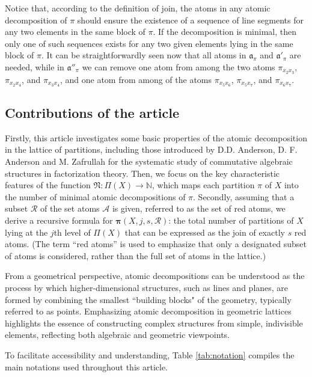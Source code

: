 \documentclass[12pt]{extarticle}
\begin{document}
	Notice that, according to the definition of join, the atoms in any atomic decomposition of $\pi$ should ensure the existence of a sequence of line segments for any two elements in the same block of $\pi$. If the decomposition is minimal, then only one of such sequences exists for any two given elements lying in the same block of $\pi$.
	It can be straightforwardly seen now that all atoms in $\mathfrak{a}_{\pi}$ and $\mathfrak{a}'_{\pi}$ are needed, while in $\mathfrak{a}''_{\pi}$ we can remove one atom from among the two atoms $\pi_{x_2x_3}$,  $\pi_{x_2x_4}$, and $\pi_{x_3x_4}$, and one atom from among of the atoms $\pi_{x_5x_6}$, $\pi_{x_5x_7}$, and $\pi_{x_6x_7}$.
	
\subsection*{Contributions of the article}
	Firstly, this article investigates some basic properties of the atomic decomposition in the lattice of partitions, including those introduced by D.D. Anderson, D. F. Anderson and M. Zafrullah for the systematic study of commutative algebraic structures in factorization theory. Then, we focus on
	the key characteristic features of the function $\mathfrak{N}:\Pi(X)\rightarrow\mathbb{N}$, which maps each partition $\pi$ of $X$ into the number of minimal atomic decompositions of $\pi$. Secondly, assuming that a subset $\mathcal{R}$ of the set atoms $\mathcal{A}$ is given, referred to as the set of red atoms, we derive a recursive formula for $\bm{\pi}(X,j,s,\mathcal{R})$: the total number of partitions of $X$ lying at the $j$th level of $\Pi(X)$ that can be expressed as the join of exactly $s$ red atoms. (The term ``red atoms'' is used to emphasize that only a designated subset of atoms is considered, rather than the full set of atoms in the lattice.)
	
	From a geometrical perspective, atomic decompositions can be understood as the process by which higher-dimensional structures, such as lines and planes, are formed by combining the smallest ``building blocks" of the geometry, typically referred to as points. Emphasizing atomic decomposition in geometric lattices highlights the essence of constructing complex structures from simple, indivisible elements, reflecting both algebraic and geometric viewpoints.
	
To facilitate accessibility and understanding, Table \ref{tab:notation} compiles the main notations used throughout this article.
	
\end{document}

